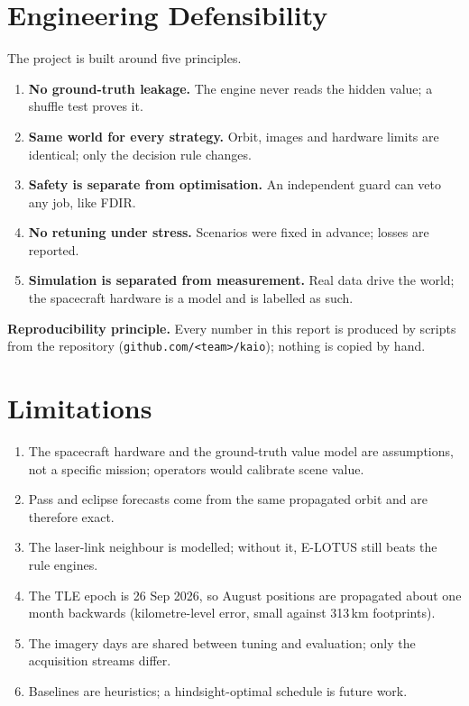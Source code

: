 \documentclass[11pt,a4paper]{article}
\newcommand{\repourl}{github.com/\textless team\textgreater/kaio}   %
\begin{document}
\section{Engineering Defensibility}
The project is built around five principles.
\begin{enumerate}
  \item \textbf{No ground-truth leakage.} The engine never reads the hidden value; a shuffle test proves it.
  \item \textbf{Same world for every strategy.} Orbit, images and hardware limits are identical; only the decision rule changes.
  \item \textbf{Safety is separate from optimisation.} An independent guard can veto any job, like FDIR.
  \item \textbf{No retuning under stress.} Scenarios were fixed in advance; losses are reported.
  \item \textbf{Simulation is separated from measurement.} Real data drive the world; the spacecraft hardware is a model and is labelled as such.
\end{enumerate}

\begin{keybox}
\textbf{Reproducibility principle.} Every number in this report is produced by scripts from the
repository (\texttt{\repourl}); nothing is copied by hand.
\end{keybox}

\section{Limitations}
\begin{enumerate}
  \item The spacecraft hardware and the ground-truth value model are assumptions, not a specific mission; operators would calibrate scene value.
  \item Pass and eclipse forecasts come from the same propagated orbit and are therefore exact.
  \item The laser-link neighbour is modelled; without it, E-LOTUS still beats the rule engines.
  \item The TLE epoch is 26 Sep 2026, so August positions are propagated about one month backwards (kilometre-level error, small against 313\,km footprints).
  \item The imagery days are shared between tuning and evaluation; only the acquisition streams differ.
  \item Baselines are heuristics; a hindsight-optimal schedule is future work.
\end{enumerate}
\end{document}
